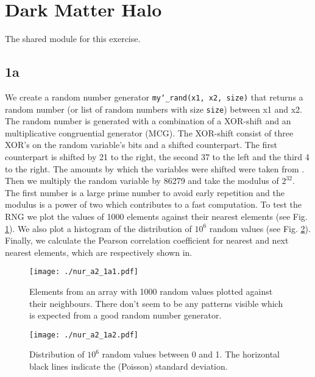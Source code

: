 \section{Dark Matter Halo}

The shared module for this exercise.



\newpage

\subsection{1a}



We create a random number generator \texttt{my\char`_rand(x1, x2, size)} that returns a random number (or list of random numbers with size \texttt{size}) between x1 and x2. The random number is generated with a combination of a XOR-shift and an multiplicative congruential generator (MCG). The XOR-shift consist of three XOR's on the random variable's bits and a shifted counterpart. The first counterpart is shifted by 21 to the right, the second 37 to the left and the third 4 to the right. The amounts by which the variables were shifted were taken from \cite{NURBOOK:1}. Then we multiply the random variable by 86279 and take the modulus of $2^{32}$. The first number is a large prime number to avoid early repetition and the modulus is a power of two which contributes to a fast computation. To test the RNG we plot the values of 1000 elements against their nearest elements (see Fig. \ref{fig:1a1}). We also plot a histogram of the distribution of $10^{6}$ random values (see Fig. \ref{fig:1a2}). Finally, we calculate the Pearson correlation coefficient for nearest and next nearest elements, which are respectively shown in.

\newpage

\begin{figure}[!ht]
  \centering
  \texttt{[image: ./nur\_a2\_1a1.pdf]}
  \caption{Elements from an array with 1000 random values plotted against their neighbours. There don't seem to be any patterns visible which is expected from a good random number generator.}
  \label{fig:1a1}
\end{figure}

\begin{figure}[!ht]
  \centering
  \texttt{[image: ./nur\_a2\_1a2.pdf]}
  \caption{Distribution of $10^{6}$ random values between 0 and 1. The horizontal black lines indicate the (Poisson) standard deviation.}
  \label{fig:1a2}
\end{figure}

